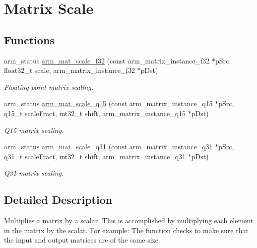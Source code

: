 \hypertarget{group__MatrixScale}{}\section{Matrix Scale}
\label{group__MatrixScale}
\subsection*{Functions}
\begin{DoxyCompactItemize}
\item 
arm\+\_\+status \hyperlink{group__MatrixScale_ga9cb4e385b18c9a0b9cbc940c1067ca12}{arm\+\_\+mat\+\_\+scale\+\_\+f32} (const arm\+\_\+matrix\+\_\+instance\+\_\+f32 $\ast$p\+Src, float32\+\_\+t scale, arm\+\_\+matrix\+\_\+instance\+\_\+f32 $\ast$p\+Dst)
\begin{DoxyCompactList}\small\item\em Floating-\/point matrix scaling. \end{DoxyCompactList}\item 
arm\+\_\+status \hyperlink{group__MatrixScale_ga7521769e2cf1c3d9c4656138cd2ae2ca}{arm\+\_\+mat\+\_\+scale\+\_\+q15} (const arm\+\_\+matrix\+\_\+instance\+\_\+q15 $\ast$p\+Src, q15\+\_\+t scale\+Fract, int32\+\_\+t shift, arm\+\_\+matrix\+\_\+instance\+\_\+q15 $\ast$p\+Dst)
\begin{DoxyCompactList}\small\item\em Q15 matrix scaling. \end{DoxyCompactList}\item 
arm\+\_\+status \hyperlink{group__MatrixScale_ga609743821ee81fa8c34c4bcdc1ed9744}{arm\+\_\+mat\+\_\+scale\+\_\+q31} (const arm\+\_\+matrix\+\_\+instance\+\_\+q31 $\ast$p\+Src, q31\+\_\+t scale\+Fract, int32\+\_\+t shift, arm\+\_\+matrix\+\_\+instance\+\_\+q31 $\ast$p\+Dst)
\begin{DoxyCompactList}\small\item\em Q31 matrix scaling. \end{DoxyCompactList}\end{DoxyCompactItemize}


\subsection{Detailed Description}
Multiplies a matrix by a scalar. This is accomplished by multiplying each element in the matrix by the scalar. For example\+:  The function checks to make sure that the input and output matrices are of the same size.

